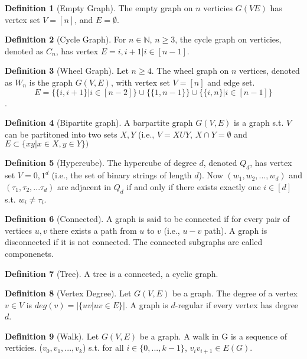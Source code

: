 \documentclass{article}
\theoremstyle{definition}
\newtheorem{define}{Definition}[section]
\begin{document}
\begin{define}[Empty Graph]
The empty graph on $n$ verticies $G(V E)$ has vertex set $V=[n]$, and $E= \emptyset$.
\end{define}

\begin{define}[Cycle Graph]
For $ n \in \mathbb{N}$, $n \geq 3$, the cycle graph on verticies, denoted as $C_n$, has vertex $E={{i, i+1}|i\in [n-1]}$.
\end{define}

\begin{define}[Wheel Graph]
Let $n\geq 4$. The wheel graph on $n$ vertices, denoted as $W_n$ is the graph $G(V, E)$, with vertex set $V=[n]$ and edge set. $$E=\{\{i, i+1\}|i\in[n-2]\}\cup\{\{1, n-1\}\}\cup \{\{i,n\}| i\in [n-1]\}$$.
\end{define}

\begin{define}[Bipartite graph]
A barpartite graph $G(V,E)$ is a graph s.t. $V$ can be partitoned into two sets $X, Y$ (i.e., $V=XUY$, $X\cap Y= \emptyset$ and $E\subset \{xy|x\in X, y \in  Y\})$
\end{define}

\begin{define}[Hypercube] 
The hypercube of degree $d$, denoted $Q_d$, has vertex set $V = {0,1}^d$ (i.e., the set of binary strings of length $d$). Now $(w_1, w_2, ..., w_d)$ and $(\tau_1, \tau_2,...\tau_d)$ are adjacent in $Q_d$ if and only if there exists exactly one $i \in [d]$ s.t. $w_i \neq \tau_i$.
\end{define}

\begin{define}[Connected]
A graph is said to be connected if for every pair of vertices $u,v$ there exists a path from $u$ to $v$ (i.e., $u-v$ path). A graph is disconnected if it is not connected. The connected subgraphs are called componenets.
\end{define}

\begin{define}[Tree]
A tree is a connected, a cyclic graph.
\end{define}

\begin{define}[Vertex Degree]
Let $G(V, E)$ be a graph. The degree of a vertex $v \in V$ is $deg(v)= |\{uv|uv\in E\}|$. A graph is $d$-regular if every vertex has degree $d$.
\end{define}

\begin{define}[Walk]
Let $G(V,E)$ be a graph. A walk in G is a sequence of verticies. ($v_0, v_1,...,v_k$) s.t. for all $i \in \{0,...,k-1\}$, $v_iv_{i+1} \in E(G)$.
\end{define}
\end{document}
